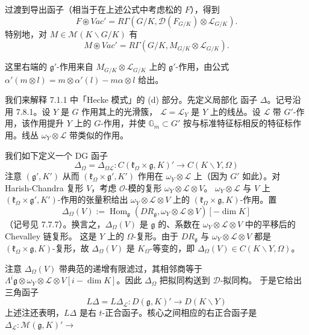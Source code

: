 过渡到导出函子（相当于在上述公式中考虑松的 $F$），得到
\begin{equation}\tag{334}
F\circledast Vac'=R\Gamma(G/K,
\mathcal{D}(F_{G/K})\otimes\mathcal{L}_{G/K}).
\end{equation}
特别地，对 $M\in\mathcal{M}(K\backslash G/K)$ 有
\begin{equation}\tag{335}
M\circledast Vac'=R\Gamma(G/K,
M_{G/K}\otimes\mathcal{L}_{G/K}).
\end{equation}


这里右端的 $\mathfrak{g}'$-作用来自
$M_{G/K}\otimes\mathcal{L}_{G/K}$ 上的 $\mathfrak{g}'$-作用，由公式
$\alpha'(m\otimes l)=m\otimes\alpha'(l)-m\alpha\otimes l$ 给出。

 我们来解释 7.1.1 中「Hecke 模式」的 (d) 部分。先定义局部化
函子 $\Delta$。记号沿用 7.8.1。设 $Y$ 是 $G$ 作用其上的光滑簇，
$\mathcal{L}=\mathcal{L}_Y$ 是 $Y$ 上的线丛。设 $\mathcal{L}$ 带
$G'$-作用，该作用提升 $Y$ 上的 $G$-作用，并使
$\mathbb{G}_m\subset G'$ 按与标准特征标相反的特征标作用。线丛
$\omega_Y\otimes\mathcal{L}$ 带类似的作用。

我们如下定义一个 DG 函子
\begin{equation}\tag{336}
\Delta_\Omega=\Delta_{\Omega\mathcal{L}}:
C(\mathfrak{k}_\Omega\times\mathfrak{g},K)'\longrightarrow
C(K\backslash Y,\Omega)
\end{equation}
注意 $(\mathfrak{g}',K')$ 从而
$(\mathfrak{k}_\Omega\times\mathfrak{g}',K')$ 作用在
$\omega_Y\otimes\mathcal{L}$ 上（因为 $G'$ 如此）。对 Harish-Chandra
复形 $V$，考虑 $\mathcal{O}$-模的复形
$\omega_Y\otimes\mathcal{L}\otimes V$。
$\omega_Y\otimes\mathcal{L}$ 与 $V$ 上
$(\mathfrak{k}_\Omega\times\mathfrak{g}',K')$-作用的张量积给出
$\omega_Y\otimes\mathcal{L}\otimes V$ 上的
$(\mathfrak{k}_\Omega\times\mathfrak{g},K)$-作用。置
\[
\Delta_\Omega(V):=\operatorname{Hom}_{\mathfrak{g}}
(DR_{\mathfrak{g}},\omega_Y\otimes\mathcal{L}\otimes V)[-\dim K]
\]
（记号见 7.7.7）。换言之，$\Delta_\Omega(V)$ 是 $\mathfrak{g}$ 的、系数在
$\omega_Y\otimes\mathcal{L}\otimes V$ 中的平移后的 Chevalley 链复形。
这是 $Y$ 上的 $\Omega$-复形。由于 $DR_{\mathfrak{g}}$ 与
$\omega_Y\otimes\mathcal{L}\otimes V$ 都是
$(\mathfrak{k}_\Omega\times\mathfrak{g},K)$-复形，故
$\Delta_\Omega(V)$ 是 $K_\Omega$-等变的，即
$\Delta_\Omega(V)\in C(K\backslash Y,\Omega)$。

注意 $\Delta_\Omega(V)$ 带典范的递增有限滤过，其相邻商等于
$\Lambda^i\mathfrak{g}\otimes\omega_Y\otimes\mathcal{L}\otimes V
[i-\dim K]$。因此 $\Delta_\Omega$ 把拟同构送到 $\mathcal{D}$-拟同构。
于是它给出三角函子
\begin{equation}\tag{337}
L\Delta=L\Delta_{\mathcal{L}}:
D(\mathfrak{g},K)'\longrightarrow D(K\backslash Y)
\end{equation}
上述注还表明，$L\Delta$ 是右 $t$-正合函子。核心之间相应的右正合函子是
$\Delta_{\mathcal{L}}:\mathcal{M}(\mathfrak{g},K)'\to$

